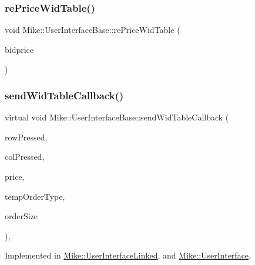 \subsubsection{\texorpdfstring{re\+Price\+Wid\+Table()}{rePriceWidTable()}}
{\footnotesize\ttfamily void Mike\+::\+User\+Interface\+Base\+::re\+Price\+Wid\+Table (\begin{DoxyParamCaption}\item[{long}]{bidprice }\end{DoxyParamCaption})}

\mbox{\label{class_mike_1_1_user_interface_base_a42469ffe57a8528064068a84e277ee6a}} 
\subsubsection{\texorpdfstring{send\+Wid\+Table\+Callback()}{sendWidTableCallback()}}
{\footnotesize\ttfamily virtual void Mike\+::\+User\+Interface\+Base\+::send\+Wid\+Table\+Callback (\begin{DoxyParamCaption}\item[{int}]{row\+Pressed,  }\item[{int}]{col\+Pressed,  }\item[{long}]{price,  }\item[{\hyperlink{namespace_mike_aa486aea8b1d0d07190982a311394e6cb}{Mike\+Order\+Type}}]{temp\+Order\+Type,  }\item[{int}]{order\+Size }\end{DoxyParamCaption})\hspace{0.3cm}{\ttfamily [protected]}, {}}



Implemented in \hyperlink{class_mike_1_1_user_interface_linked_a687ab0f108f97cae19ee81688a45476a}{Mike\+::\+User\+Interface\+Linked}, and \hyperlink{class_mike_1_1_user_interface_a2001cad2040c95ddea43b7d43f9e82bb}{Mike\+::\+User\+Interface}.

\mbox{\label{class_mike_1_1_user_interface_base_afa6ddc0cce6cf6df28a542bd7e8c3686}} 
